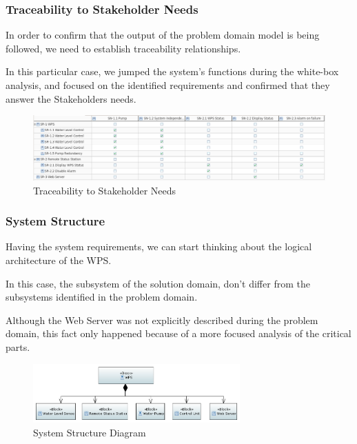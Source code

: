 \documentclass[11pt]{article}
\begin{document}
\newpage

\subsubsection{Traceability to Stakeholder Needs}

In order to confirm that the output of the problem domain model is being followed, we need to establish traceability relationships. 

In this particular case, we jumped the system's functions during the white-box analysis, and focused on the identified requirements and confirmed that they answer the Stakeholders needs.

\begin{figure}[H]
  \centering
  \includegraphics[width=\linewidth]{../diagrams/traceability.png}
  \caption{Traceability to Stakeholder Needs}
  \label{fig:Traceability}
\end{figure}

\subsubsection{System Structure}

Having the system requirements, we can start thinking about the logical architecture of the WPS.

In this case, the subsystem of the solution domain, don't differ from the subsystems identified in the problem domain. 

Although the Web Server was not explicitly described during the problem domain, this fact only happened because of a more focused analysis of the critical parts.

\begin{figure}[H]
  \centering
  \includegraphics[width=300px]{../diagrams/system-structure.png}
  \caption{System Structure Diagram}
  \label{fig:System Structure Diagram}
\end{figure}
\end{document}
